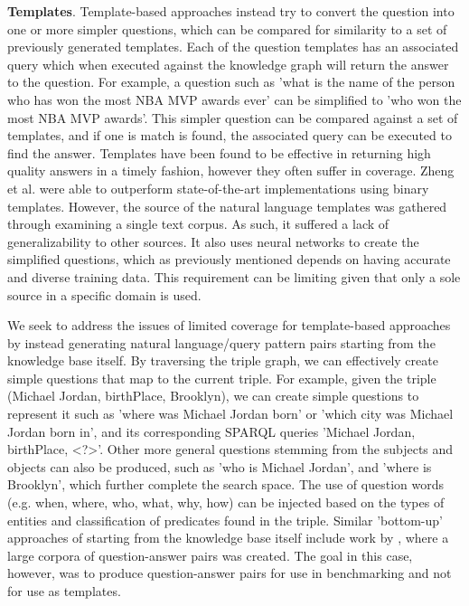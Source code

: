 \documentclass[sigplan,screen]{acmart}
\begin{document}
\textbf{Templates}. Template-based approaches instead try to convert the question into one or more simpler questions, which can be compared for similarity to a set of previously generated templates. Each of the question templates has an associated query which when executed against the knowledge graph will return the answer to the question. For example, a question such as 'what is the name of the person who has won the most NBA MVP awards ever' can be simplified to 'who won the most NBA MVP awards'. This simpler question can be compared against a set of templates, and if one is match is found, the associated query can be executed to find the answer. Templates have been found to be effective in returning high quality answers in a timely fashion, however they often suffer in coverage. Zheng et al. were able to outperform state-of-the-art implementations using binary templates. However, the source of the natural language templates was gathered through examining a single text corpus. As such, it suffered a lack of generalizability to other sources. It also uses neural networks to create the simplified questions, which as previously mentioned depends on having accurate and diverse training data. This requirement can be limiting given that only a sole source in a specific domain is used.

We seek to address the issues of limited coverage for template-based approaches by instead generating natural language/query pattern pairs starting from the knowledge base itself. By traversing the triple graph, we can effectively create simple questions that map to the current triple. For example, given the triple (Michael Jordan, birthPlace, Brooklyn), we can create simple questions to represent it such as 'where was Michael Jordan born' or 'which city was Michael Jordan born in', and its corresponding SPARQL queries 'Michael Jordan, birthPlace, <?>'. Other more general questions stemming from the subjects and objects can also be produced, such as 'who is Michael Jordan', and 'where is Brooklyn', which further complete the search space. The use of question words (e.g. when, where, who, what, why, how) can be injected based on the types of entities and classification of predicates found in the triple. Similar 'bottom-up' approaches of starting from the knowledge base itself include work by \citeauthor{generating-factoids}, where a large corpora of question-answer pairs was created. The goal in this case, however, was to produce question-answer pairs for use in benchmarking and not for use as templates.
\end{document}
